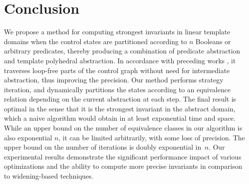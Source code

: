 \documentclass{llncs}
\newcommand{\pponly}[1]{}
\newcommand{\rronly}[1]{#1}
\begin{document}
\section{Conclusion}
\pponly{\vspace*{-0.5ex}}
We propose a method for computing strongest invariants in
linear template domains when the control states are
partitioned according to $n$ Booleans or arbitrary predicates, thereby
producing a combination of predicate abstraction and template
polyhedral abstraction.  \rronly{In accordance with preceding works
\cite{Henry_Monniaux_Moy_SAS2012,Gawlitza_Monniaux_LMCS12,Monniaux_Gonnord_SAS11},
it traverses loop-free parts of the control graph without need for
intermediate abstraction, thus improving the precision.} Our method
performs strategy iteration, and dynamically partitions 
the states according to an equivalence relation depending on the
current abstraction at each step. The final result is optimal in
the sense that it is the strongest invariant in the abstract domain{\rronly,
which a naive algorithm would obtain in at least exponential time and
space}. \rronly{While an upper bound on the number of equivalence classes in
our algorithm is also exponential $n$, it can be limited arbitrarily,
with some loss of precision. The upper bound on the number of
iterations is doubly exponential in~$n$.}
Our experimental results demonstrate the significant
performance impact of various optimizations and
the ability to compute more precise invariants in comparison to
widening-based techniques.

\pponly{
In preceding work without partitioning
\cite{GM11,Gawlitza_Monniaux_LMCS12}, the single-exponential upper
bound was shown to be reached by a contrived example
program, and the decision problem associated with the least invariant
computation (``given a template, a transition relation, an initial
state and a bad state, is there an inductive invariant that excludes
the bad state'') was shown to be $\Sigma^p_2$-complete. In contrast,
although we have an \textsc{nexptime}
upper bound and proved \textsc{exptime}-hardness
(see \cite{MS14a} for a proof)
for the problem with partitioning,
we have not yet been able to \rronly{narrow the
interval despite repeated attempts at proving}\pponly{prove}
\textsc{nexptime}-completeness\rronly{. It is thus possible
  that }\pponly{---thus} the worst-case
complexity \pponly{could}\rronly{is} possibly \pponly{be }better.
}



\end{document}
